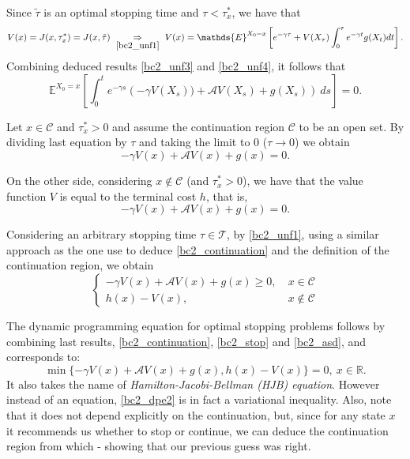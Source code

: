 Since $\tilde{\tau}$ is an optimal stopping time and $\tau< \tau^*_x$, we have that \begin{equation}
V(x)=J(x,\tau^*_x)=J(x,\tilde{\tau}) \  \underset{\eqref{bc2_unf1}}{\Rightarrow} \  V(x)=\mathds{E}^{X_0=x} \left[e^{-\gamma \tau} + V(X_\tau) \int^\tau_0 e^{-\gamma t}g(X_t)dt \right].
\label{bc2_unf4}
\end{equation} 
Combining deduced results \eqref{bc2_unf3} and \eqref{bc2_unf4}, it follows that
$$\mathds{E}^{X_0=x} \left[ \int^t_0  e^{-\gamma s} \left( - \gamma V(X_s))+\mathcal{A}V(X_s)+g(X_s) \right) \ ds \right]=0.$$

 Let $x\in \mathcal{C}$ and $\tau_x^*>0$ and assume the continuation region $\mathcal{C}$ to be an open set. By dividing last equation by $\tau$ and taking the limit to 0 ($\tau \rightarrow 0$) we obtain
\begin{equation}
- \gamma V(x)+\mathcal{A}V(x)+g(x)=0.
\label{bc2_continuation}
\end{equation}

On the other side, considering $x\notin \mathcal{C}$ (and $\tau_x^*>0$), we have that the value function $V$ is equal to the terminal cost $h$, that is,
\begin{equation}
 -\gamma V(x)+\mathcal{A}V(x)+g(x)=0.
\label{bc2_stop}
\end{equation}

Considering an arbitrary stopping time $\tau \in \mathcal{T}$, by \eqref{bc2_unf1}, using a similar approach as the one use to deduce \eqref{bc2_continuation} and the definition of the continuation region, we obtain 
\begin{equation}
	\begin{cases}
	- \gamma V(x)+\mathcal{A}V(x)+g(x) \geq 0, \ &x \in \mathcal{C}\\
	h(x)-V(x), \ &x \notin \mathcal{C}
	\end{cases}
	\label{bc2_asd}
\end{equation}

The dynamic programming equation for optimal stopping problems follows by combining last results, \eqref{bc2_continuation}, \eqref{bc2_stop} and \eqref{bc2_asd}, and corresponds to:
\begin{equation}
\min \{ - \gamma V(x)+\mathcal{A}V(x)+g(x), h(x)-V(x)\}=0, \ x\in \mathds{R}.
\label{bc2_dpe2}
\end{equation}
It also takes the name of \textit{Hamilton-Jacobi-Bellman (HJB) equation}. However instead of an equation, \eqref{bc2_dpe2} is in fact a variational inequality. Also, note that it does not depend explicitly on the continuation, but, since for any state $x$ it recommends us whether to stop or continue, we can deduce the continuation region from which - showing that our previous guess was right.

